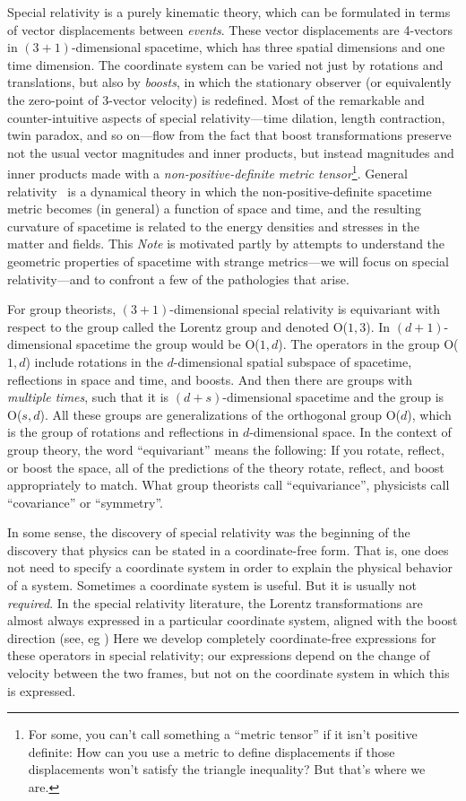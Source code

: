 \documentclass{article}
\newcommand{\plus}{\!+\!} %
\newcommand{\documentname}{\textsl{Note}}
\begin{document}
Special relativity \cite{sr} is a purely kinematic theory, which can be formulated in terms of vector displacements between \emph{events}.
These vector displacements are 4-vectors in $(3\plus1)$-dimensional spacetime, which has three spatial dimensions and one time dimension.
The coordinate system can be varied not just by rotations and translations, but also by \emph{boosts}, in which the stationary observer (or equivalently the zero-point of 3-vector velocity) is redefined.
Most of the remarkable and counter-intuitive aspects of special relativity---time dilation, length contraction, twin paradox, and so on---flow from the fact that boost transformations preserve not the usual vector magnitudes and inner products, but instead magnitudes and inner products made with a \emph{non-positive-definite metric tensor}\footnote{For some, you can't call something a ``metric tensor'' if it isn't positive definite: How can you use a metric to define displacements if those displacements won't satisfy the triangle inequality? But that's where we are.}.
General relativity~\cite{gr} is a dynamical theory in which the non-positive-definite spacetime metric becomes (in general) a function of space and time, and the resulting curvature of spacetime is related to the energy densities and stresses in the matter and fields.
This \documentname{} is motivated partly by attempts to understand the geometric properties of spacetime with strange metrics---we will focus on special relativity---and to confront a few of the pathologies that arise.

For group theorists, $(3\plus1)$-dimensional special relativity is equivariant with respect to the group called the Lorentz group and denoted O($1,3$).
In $(d\plus1)$-dimensional spacetime the group would be O($1,d$).
The operators in the group O($1,d$) include rotations in the $d$-dimensional spatial subspace of spacetime, reflections in space and time, and boosts.
And then there are groups with \emph{multiple times}, such that it is $(d\plus s)$-dimensional spacetime and the group is O($s,d$).
All these groups are generalizations of the orthogonal group O($d$), which is the group of rotations and reflections in $d$-dimensional space.
In the context of group theory, the word ``equivariant'' means the following:
If you rotate, reflect, or boost the space, all of the predictions of the theory rotate, reflect, and boost appropriately to match.
What group theorists call ``equivariance'', physicists call ``covariance'' or ``symmetry''.

In some sense, the discovery of special relativity was the beginning of the discovery that physics can be stated in a coordinate-free form.
That is, one does not need to specify a coordinate system in order to explain the physical behavior of a system.
Sometimes a coordinate system is useful.
But it is usually not \emph{required}.
In the special relativity literature, the Lorentz transformations are almost always expressed in a particular coordinate system, aligned with the boost direction (see, eg \cite{foo})
Here we develop completely coordinate-free expressions for these operators in special relativity; our expressions depend on the change of velocity between the two frames, but not on the coordinate system in which this is expressed.
\end{document}
